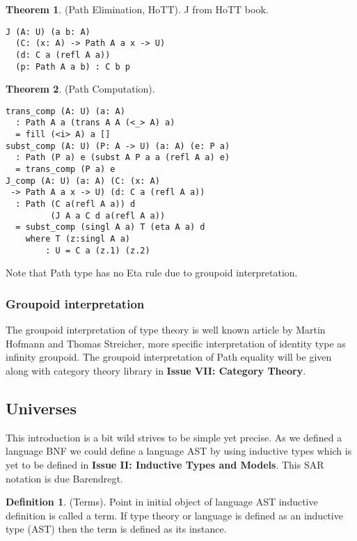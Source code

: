 \documentclass[twocolumn,10pt]{article}
\theoremstyle{definition}
\newtheorem{theorem}{Theorem}
\newtheorem{definition}{Definition}
\begin{document}
\begin{theorem} (Path Elimination, HoTT).
J from HoTT book.
\begin{lstlisting}
J (A: U) (a b: A)
  (C: (x: A) -> Path A a x -> U)
  (d: C a (refl A a))
  (p: Path A a b) : C b p
\end{lstlisting}
\end{theorem}

\begin{theorem} (Path Computation).
\begin{lstlisting}
trans_comp (A: U) (a: A)
  : Path A a (trans A A (<_> A) a)
  = fill (<i> A) a []
subst_comp (A: U) (P: A -> U) (a: A) (e: P a)
  : Path (P a) e (subst A P a a (refl A a) e)
  = trans_comp (P a) e
J_comp (A: U) (a: A) (C: (x: A)
 -> Path A a x -> U) (d: C a (refl A a))
  : Path (C a(refl A a)) d
         (J A a C d a(refl A a))
  = subst_comp (singl A a) T (eta A a) d
    where T (z:singl A a)
        : U = C a (z.1) (z.2)
\end{lstlisting}
\end{theorem}

Note that  Path type has no Eta rule due to groupoid interpretation.

\subsubsection*{Groupoid interpretation}

The groupoid interpretation of type theory is well known article by Martin Hofmann and Thomas Streicher,
more specific interpretation of identity type as infinity groupoid.
The groupoid interpretation of Path equality will be given along with category theory library
in {\bf Issue VII: Category Theory}.

\subsection{Universes}

This introduction is a bit wild strives to be simple yet precise.
As we defined a language BNF we could define a language AST by
using inductive types which is yet to be defined
in {\bf Issue II: Inductive Types and Models}. This SAR notation is due Barendregt.

\begin{definition} (Terms). Point in initial object of language AST
inductive definition is called a term. If type theory or language is defined as
an inductive type (AST) then the term is defined as its instance.
\end{definition}
\end{document}
